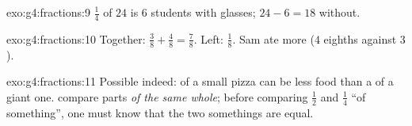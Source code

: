 \begin{solution}{exo:g4:fractions:9}
$\frac14$ of $24$ is $6$ students with glasses; $24 - 6 = 18$
without.
\end{solution}

\begin{solution}{exo:g4:fractions:10}
Together: $\frac38 + \frac48 = \frac78$. Left: $\frac18$. Sam ate
more ($4$ eighths against $3$).
\end{solution}

\begin{solution}{exo:g4:fractions:11}
Possible indeed:  of a small pizza can be less food than a
 of a giant one.  compare parts \emph{of the same
whole}; before comparing $\frac12$ and $\frac14$ ``of something'',
one must know that the two somethings are equal.
\end{solution}
